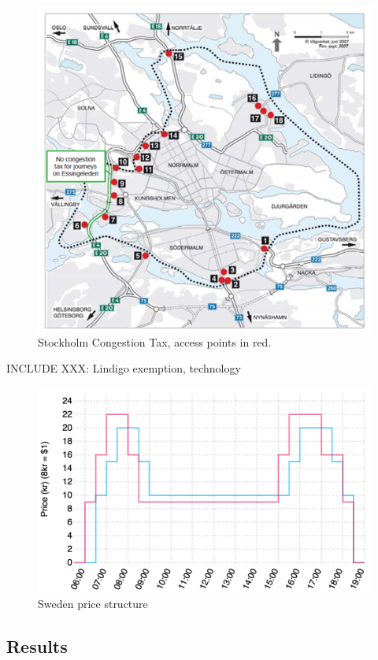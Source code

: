 \begin{figure}
\includegraphics[width=5in]{../img/stockholm-map.png}
\caption{Stockholm Congestion Tax, access points in red. \citep{transportstyrelsen2015}}
\label{fig:stockholm-map}
\end{figure}

INCLUDE XXX: Lindigo exemption, technology


\begin{figure}
\includegraphics[width=5in]{../img/sweden-prices.png}
\caption{Sweden price structure \citep{transportstyrelsen2015}}
\label{fig:sweden-schedules}
\end{figure}

\subsection{Results}

